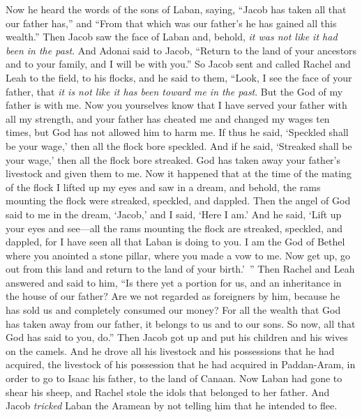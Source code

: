 \begin{biblechapter} %
 Now he heard the words of the sons of Laban, saying, “Jacob has taken all that our father has,” and “From that which was our father’s he has gained all this wealth.”
\verse Then Jacob saw the face of Laban and, behold, \textit{it was not like it had been in the past}.
\verse And Adonai said to Jacob, “Return to the land of your ancestors and to your family, and I will be with you.”
\verse So Jacob sent and called Rachel and Leah to the field, to his flocks,
\verse and he said to them, “Look, I see the face of your father, that \textit{it is not like it has been toward me in the past}. But the God of my father is with me.
\verse Now you yourselves know that I have served your father with all my strength,
\verse and your father has cheated me and changed my wages ten times, but God has not allowed him to harm me.
\verse If thus he said, ‘Speckled shall be your wage,’ then all the flock bore speckled. And if he said, ‘Streaked shall be your wage,’ then all the flock bore streaked.
\verse God has taken away your father’s livestock and given them to me.
\verse Now it happened that at the time of the mating of the flock I lifted up my eyes and saw in a dream, and behold, the rams mounting the flock were streaked, speckled, and dappled.
\verse Then the angel of God said to me in the dream, ‘Jacob,’ and I said, ‘Here I am.’
\verse And he said, ‘Lift up your eyes and see—all the rams mounting the flock are streaked, speckled, and dappled, for I have seen all that Laban is doing to you.
\verse I am the God of Bethel where you anointed a stone pillar, where you made a vow to me. Now get up, go out from this land and return to the land of your birth.’ ”
\verse Then Rachel and Leah answered and said to him, “Is there yet a portion for us, and an inheritance in the house of our father?
\verse Are we not regarded as foreigners by him, because he has sold us and completely consumed our money?
\verse For all the wealth that God has taken away from our father, it belongs to us and to our sons. So now, all that God has said to you, do.”
\verse Then Jacob got up and put his children and his wives on the camels.
\verse And he drove all his livestock and his possessions that he had acquired, the livestock of his possession that he had acquired in Paddan-Aram, in order to go to Isaac his father, to the land of Canaan.
\verse Now Laban had gone to shear his sheep, and Rachel stole the idols that belonged to her father.
\verse And Jacob \textit{tricked} Laban the Aramean by not telling him that he intended to flee.

\end{biblechapter}
